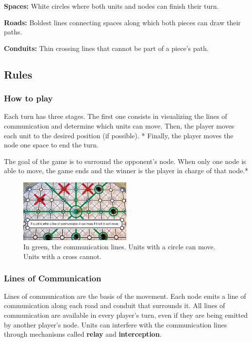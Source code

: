 \documentclass[a4paper]{article}
\begin{document}
\textbf{Spaces: }White circles where both units and nodes can finish their turn.

\textbf{Roads: }Boldest lines connecting spaces along which both pieces can draw their paths.

\textbf{Conduits: }Thin crossing lines that cannot be part of a piece's path.


\subsection{Rules}

\subsubsection{How to play}
Each turn has three stages. The first one consists in visualizing the lines of communication and determine which units can move. Then, the player moves each unit to the desired position (if possible). * Finally, the player moves the node one space to end the turn.


The goal of the game is to surround the opponent's node. When only one node is able to move, the game ends and the winner is the player in charge of that node.*
\begin{figure}[h!]
	\centering
	\includegraphics[width=0.5\textwidth]{signallines.jpg}
	\caption{In green, the communication lines. Units with a circle can move. Units with a cross cannot.}
	\label{Image: signallines}
\end{figure}

\subsubsection{Lines of Communication}

Lines of communication are the basis of the movement. Each node emits a line of communication along each road and conduit that surrounds it. All lines of communication are available in every player's turn, even if they are being emitted by another player's node. Units can interfere with the communication lines through mechanisms called \textbf{relay} and \textbf{interception}.
\end{document}

